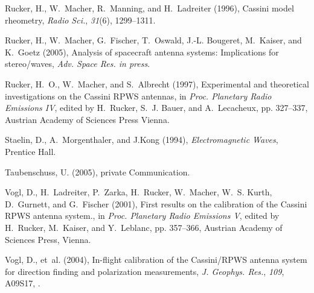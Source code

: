 \documentclass[a4paper,10pt]{thesis}
\begin{document}
\begin{thebibliography}{24}
Rucker, H., W.~Macher, R.~Manning, and H.~Ladreiter (1996), Cassini model
  rheometry, \textit{Radio Sci.}, \textit{31}(6), 1299--1311.

Rucker, H., W.~Macher, G.~Fischer, T.~Oswald, J.-L. Bougeret, M.~Kaiser, and
  K.~Goetz (2005), Analysis of spacecraft antenna systems: Implications for
  stereo/waves, \textit{Adv. Space Res. in press}.

Rucker, H.~O., W.~Macher, and S.~Albrecht (1997), Experimental and theoretical
  investigations on the Cassini RPWS antennas, in \textit{Proc. Planetary Radio
  Emissions IV}, edited by H.~Rucker, S.~J. Bauer, and A.~Lecacheux, pp.
  327--337, Austrian Academy of Sciences Press Vienna.

Staelin, D., A.~Morgenthaler, and J.Kong (1994), \textit{Electromagnetic
  Waves}, Prentice Hall.

Taubenschuss, U. (2005), private Communication.

Vogl, D., H.~Ladreiter, P.~Zarka, H.~Rucker, W.~Macher, W.~S. Kurth,
  D.~Gurnett, and G.~Fischer (2001), First results on the calibration of the
  Cassini RPWS antenna system., in \textit{Proc. Planetary Radio Emissions V},
  edited by H.~Rucker, M.~Kaiser, and Y.~Leblanc, pp. 357--366, Austrian
  Academy of Sciences Press, Vienna.

Vogl, D., et~al. (2004), In-flight calibration of the Cassini/RPWS antenna
  system for direction finding and polarization measurements, \textit{J.
  Geophys. Res.}, \textit{109}, A09S17, .

\end{thebibliography}

%
%

\listoffigures
\listoftables


\printindex
\end{document}
